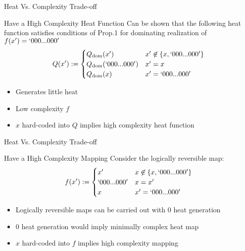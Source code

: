 \begin{frame}{Heat Vs. Complexity Trade-off}
\begin{block}{Have a High Complexity Heat Function}
Can be shown that the following heat function satisfies conditions of Prop.1 for dominating realization of $f(x') = `000...000'$
\begin{equation*}
    Q(x') := \begin{cases} Q_\text{dom}(x') &x'\not\in \{x,`000...000'\}\\
    Q_\text{dom}(`000...000') &x' =x\\
    Q_\text{dom}(x) &x' = `000...000'\end{cases}
\end{equation*}
\begin{itemize}
    \item Generates little heat
    \item Low complexity $f$
    \item $x$ hard-coded into $Q$ implies high complexity heat function
\end{itemize}
\end{block}
\end{frame}

\begin{frame}{Heat Vs. Complexity Trade-off}
\begin{block}{Have a High Complexity Mapping}
Consider the logically reversible map:
\begin{equation*}
    f(x') := \begin{cases} x' & x\not\in \{x,`000...000'\}\\
    `000...000' & x=x'\\
    x & x'= `000...000'\end{cases}
\end{equation*}
\begin{itemize}
    \item Logically reversible maps can be carried out with 0 heat generation
    \item 0 heat generation would imply minimally complex heat map
    \item $x$ hard-coded into $f$ implies high complexity mapping
\end{itemize}
\end{block}
\end{frame}
